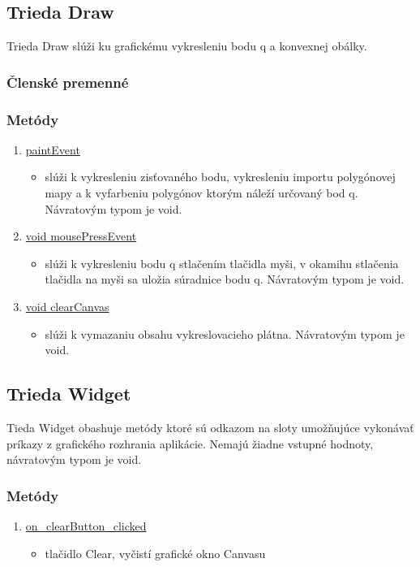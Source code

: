 \documentclass[12pt]{article}
\begin{document}
\subsection{Trieda Draw}
Trieda Draw slúži ku grafickému vykresleniu bodu q a konvexnej obálky.

\subsubsection{Členské premenné}



\subsubsection{Metódy}
\begin{enumerate}
\item[] \underline{paintEvent}
\begin{itemize}
\item slúži k vykresleniu zisťovaného bodu, vykresleniu importu polygónovej mapy a k vyfarbeniu polygónov ktorým náleží určovaný bod q. Návratovým typom je void.
\end{itemize}
\item[] \underline{void mousePressEvent}
\begin{itemize}
\item slúži k vykresleniu bodu q stlačením tlačidla myši, v okamihu stlačenia tlačidla na myši sa uložia súradnice bodu q. Návratovým typom je void.
\end{itemize}
\item[] \underline{void clearCanvas}
\begin{itemize}
\item slúži k vymazaniu obsahu vykreslovacieho plátna. Návratovým typom je void.
\end{itemize}
\end{enumerate}

\subsection{Trieda Widget}
Tieda Widget obashuje metódy ktoré sú odkazom na sloty umožňujúce vykonávať príkazy z grafického rozhrania aplikácie. Nemajú žiadne vstupné hodnoty, návratovým typom je void.

\subsubsection{Metódy}
\begin{enumerate}
\item[] \underline{on\_clearButton\_clicked}
\begin{itemize}
\item tlačidlo Clear, vyčistí grafické okno Canvasu
\end{itemize}
\end{enumerate}
\end{document}
